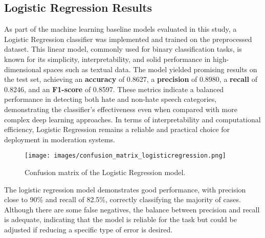 \subsection{Logistic Regression Results}
\label{sec:logistic_regression_results}

As part of the machine learning baseline models evaluated in this study, a Logistic Regression classifier was implemented and trained on the preprocessed dataset. This linear model, commonly used for binary classification tasks, is known for its simplicity, interpretability, and solid performance in high-dimensional spaces such as textual data. The model yielded promising results on the test set, achieving an \textbf{accuracy} of 0.8627, a \textbf{precision} of 0.8980, a \textbf{recall} of 0.8246, and an \textbf{F1-score} of 0.8597. These metrics indicate a balanced performance in detecting both hate and non-hate speech categories, demonstrating the classifier's effectiveness even when compared with more complex deep learning approaches. In terms of interpretability and computational efficiency, Logistic Regression remains a reliable and practical choice for deployment in moderation systems.

\begin{figure}[H]
    \centering
    \texttt{[image: images/confusion\_matrix\_logisticregression.png]} 
    \caption{Confusion matrix of the Logistic Regression model.}
    \label{fig:confusion_matrix_logistic_regression}
\end{figure}

The logistic regression model demonstrates good performance, with precision close to 90\% and recall of 82.5\%, correctly classifying the majority of cases. Although there are some false negatives, the balance between precision and recall is adequate, indicating that the model is reliable for the task but could be adjusted if reducing a specific type of error is desired.